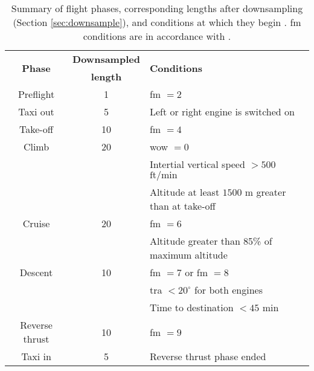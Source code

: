 \begin{table}
    \begin{center}
        \caption{\label{tab:flight_phases} Summary of flight phases, corresponding lengths after downsampling (Section \ref{sec:downsample}), and conditions at which they begin \cite[]{konig_br725stats_2018}. \ac{fm} conditions are in accordance with \citet{reischl_br700-725a1-12_2014}.}
        \begin{tabular}{ c c l }
            \multirow{2}{*}{\textbf{Phase}} & \textbf{Downsampled} & \multirow{2}{*}{\textbf{Conditions}} \\
            & \textbf{length} & \\
            \midrule
            Preflight & 1 & \ac{fm} \(= 2\) \\
            Taxi out & 5 & Left or right engine is switched on \\
            Take-off & 10 & \ac{fm} \(= 4\) \\
            Climb & 20 & \ac{wow} \(= 0\) \\
            & & Intertial vertical speed \(> 500\) \(\text{ft} / \text{min}\) \\
            & & Altitude at least \(1500 \) m greater than at take-off \\
            Cruise & 20 & \ac{fm} \(= 6\) \\
            & & Altitude greater than 85\% of maximum altitude \\
            Descent & 10 & \ac{fm} \(= 7\) or \ac{fm} \(= 8\) \\
            & & \ac{tra} \(< 20^{\circ} \) for both engines \\
            & & Time to destination \(< 45\) \(\text{min}\) \\
            Reverse thrust & 10 & \ac{fm} \(= 9\) \\
            Taxi in & 5 & Reverse thrust phase ended
        \end{tabular}
    \end{center}
\end{table}


